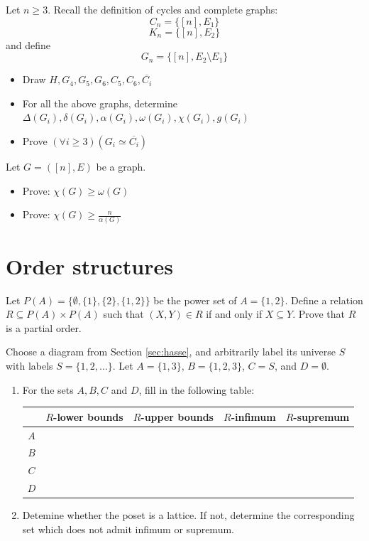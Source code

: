 \documentclass[11pt,paper=b5,footinclude,headinclude]{scrbook} %
\theoremstyle{remark}
\theoremstyle{definition} %
\theoremstyle{theorem} %
\newtheorem{ex}{Exercise\hypertarget{sol:\theex}}[chapter]
\begin{document}
\begin{ex}
    Let $n\ge 3$. Recall the definition of cycles and complete graphs:
\[C_{n}=\{[n], E_{1}\}\]
\[K_{n}=\{[n], E_{2}\}\]
and define
\[G_{n}=\{[n], E_{2} \setminus E_{1}\}\]
\begin{itemize}
    \item Draw \(H, G_{4}, G_{5}, G_{6}, C_{5}, C_{6}, \overline{C_{i}}\)
    \item For all the above graphs, determine \(\Delta(G_{i}), \delta(G_{i}), \alpha(G_{i}), \omega(G_{i}), \chi(G_{i}), g(G_{i})\)
    \item Prove \((\forall i \geq 3) (G_{i} \simeq \overline{C_{i}})\)
\end{itemize}

\end{ex}
\begin{ex}
 Let \(G = ([n], E)\) be a graph.
\begin{itemize}
\item Prove: \(\chi (G) \geq \omega (G)\)
\item Prove: \(\chi (G) \geq \frac{n}{\alpha(G)}\)
\end{itemize}
\end{ex}



\section{Order structures}
\begin{ex}
Let \(P(A) = \{\emptyset, \{1\}, \{2\}, \{1, 2\}\}\) be the power set of \(A = \{1, 2\}\). Define a relation \(R \subseteq P(A) \times P(A)\) such that \((X, Y) \in R\) if and only if \(X \subseteq Y\).
    Prove that \(R\) is a partial order. 
\end{ex}

\begin{ex}
    Choose a diagram from Section \ref{sec:hasse}, and arbitrarily label its universe $S$ with labels $S=\{1,2,\dots\}$.
    Let $A=\{1,3\}$, $B=\{1,2,3\}$, $C=S$, and $D=\emptyset$. 
    \begin{enumerate}
        \item 
    For the sets $A,B,C$ and $D$, fill in the following table:

    \begin{tabular}{c|c|c|c|c}
         &$R$-lower bounds &$R$-upper bounds & $R$-infimum
         & $R$-supremum \\\hline
         $A$ &&&&\\
         $B$ &&&&\\
         $C$ &&&&\\
         $D$ &&&&
    \end{tabular}
\item Detemine whether the poset is a lattice. If not, determine the corresponding set which does not admit infimum or supremum.
    \end{enumerate}

\end{ex}
\end{document}
